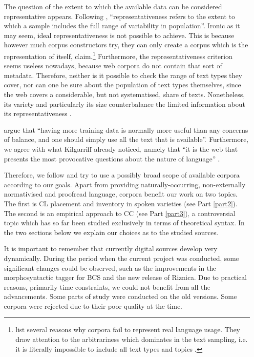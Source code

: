The question of the extent to which the available data can be considered representative appears. Following \citet[243]{Biber05}, “representativeness refers to the extent to which a sample includes the full range of variability in population”. Ironic as it may seem, ideal representativeness is not possible to achieve. This is because however much corpus constructors try, they can only create a corpus which is the representation of itself, \citet[1]{KilgarriffGrefenstette03} claim.\footnote{\citet[8f]{KilgarriffGrefenstette03} list several reasons why corpora fail to represent real language usage. They draw attention to the arbitrariness which dominates in the text sampling, i.e. it is literally impossible to include all text types and topics \citep[cf.][9]{KilgarriffGrefenstette03}.}  Furthermore, the representativeness criterion seems useless nowadays, because web corpora do not contain that sort of metadata. Therefore, neither is it possible to check the range of text types they cover, nor can one be sure about the population of text types themselves, since the web covers a considerable, but not systematised, share of texts. Nonetheless, its variety and particularly its size counterbalance the limited information about its representativeness \citep[45]{Gato14}. 

\citet[120]{ManningSchutze99} argue that “having more training data is normally more useful than any concerns of balance, and one should simply use all the text that is available”. Furthermore, we agree with what Kilgarriff already noticed, namely that “it is the web that presents the most provocative questions about the nature of language” \citep[cf.][344]{Kilgarriff01}. 

Therefore, we follow \citet{ManningSchutze99} and try to use a possibly broad scope of available corpora according to our goals. Apart from providing naturally-occurring, non-externally normativised and proofread language, corpora benefit our work on two topics. The first is CL placement and inventory in spoken varieties (see Part \ref{part2}). The second is an empirical approach to CC (see Part \ref{part3}), a controversial topic which has so far been studied exclusively in terms of theoretical syntax. In the two sections below we explain our choices as to the studied sources.

It is important to remember that currently digital sources develop very dynamically. During the period when the current project was conducted, some significant changes could be observed, such as the improvements in the morphosyntactic tagger for BCS and the new release of Riznica. Due to practical reasons, primarily time constraints, we could not benefit from all the advancements. Some parts of study were conducted on the old versions. Some corpora were rejected due to their poor quality at the time.

